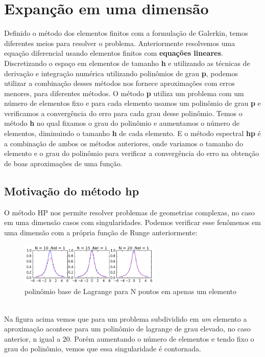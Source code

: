 \chapter{Expanção em uma dimensão}
 Definido o método dos elementos finitos com a formulação de Galerkin, temos diferentes meios para resolver o problema. Anteriormente resolvemos uma equação diferencial usando elementos finitos com \textbf{equações lineares}. Discretizando o espaço em elementos de tamanho \textbf{h} e utilizando as técnicas de derivação e integração numérica utilizando polinômios de grau \textbf{p}, podemos utilizar a combinação desses métodos nos fornece aproximações com erros menores, para diferentes métodos.
 O método \textbf{p} utiliza um problema com um número de elementos fixo e para cada elemento usamos um  polinômio de grau \textbf{p} e verificamos a convergência do erro para cada grau desse polinômio. Temos o método \textbf{h} no qual fixamos o grau do polinômio e aumentamos o número de elementos, diminuindo o tamanho \textbf{h} de cada elemento.
 E o método espectral \textbf{hp} é a combinação de ambos os métodos anteriores, onde variamos o tamanho do elemento e o grau do polinômio para verificar a convergência do erro na obtenção de boas aproximações de uma função. 
 \section{Motivação do método hp}
 O método HP nos permite resolver problemas de geometrias complexas, no caso em uma dimensão casos com singularidades. Podemos verificar esse fenômenos em uma dimensão com a própria função de Runge anteriormente:
\begin{figure}[!h]
\includegraphics[width=0.6\textwidth, center ]{figuras/compara_metodo_n.png}
\caption{polinômio base de Lagrange para N  pontos em apenas um elemento}
\end{figure}
\\ Na figura acima vemos que para um problema subdividido em \emph{um} elemento a aproximação acontece para um polinômio de lagrange de grau elevado, no caso anterior, n igual a 20. Porém  aumentando o número de elementos e tendo fixo o grau do polinômio, vemos que essa singularidade é contornada.

